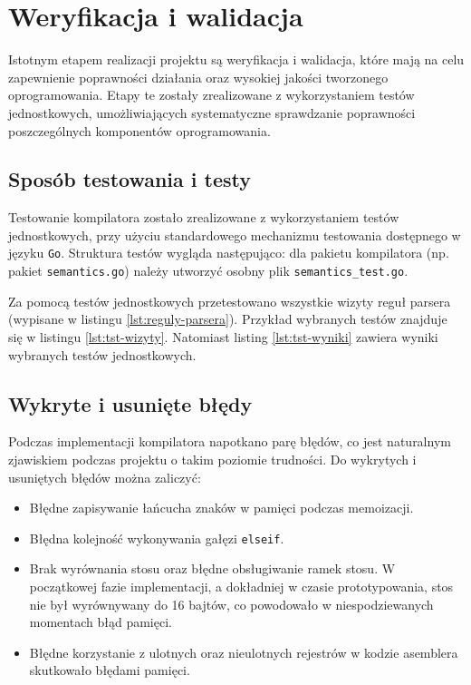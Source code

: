 \chapter{Weryfikacja i walidacja}
\label{ch:06}
Istotnym etapem realizacji projektu są weryfikacja i walidacja, które mają na celu zapewnienie poprawności działania oraz wysokiej jakości tworzonego oprogramowania. Etapy te zostały zrealizowane z wykorzystaniem testów jednostkowych, umożliwiających systematyczne sprawdzanie poprawności poszczególnych komponentów oprogramowania.

\section{Sposób testowania i testy}

Testowanie kompilatora zostało zrealizowane z wykorzystaniem testów jednostkowych, przy użyciu standardowego mechanizmu testowania dostępnego w języku \verb|Go|. Struktura testów wygląda następująco: dla pakietu kompilatora (np. pakiet \verb|semantics.go|) należy utworzyć osobny plik \verb|semantics_test.go|.

Za pomocą testów jednostkowych przetestowano wszystkie wizyty reguł parsera (wypisane w listingu \ref{lst:reguly-parsera}). Przykład wybranych testów znajduje się w listingu \ref{lst:tst-wizyty}.
Natomiast listing \ref{lst:tst-wyniki} zawiera wyniki wybranych testów jednostkowych.

\section{Wykryte i usunięte błędy}

Podczas implementacji kompilatora napotkano parę błędów, co jest naturalnym zjawiskiem podczas projektu o takim poziomie trudności. Do wykrytych i usuniętych błędów można zaliczyć:

\begin{itemize}
    \item Błędne zapisywanie łańcucha znaków w pamięci podczas memoizacji.
    \item Błędna kolejność wykonywania gałęzi \verb|elseif|.
    \item Brak wyrównania stosu oraz błędne obsługiwanie ramek stosu. W początkowej fazie implementacji, a dokładniej w czasie prototypowania, stos nie był wyrównywany do 16 bajtów, co powodowało w niespodziewanych momentach błąd pamięci.
    \item Błędne korzystanie z ulotnych oraz nieulotnych rejestrów w kodzie asemblera skutkowało błędami pamięci.

\end{itemize}

